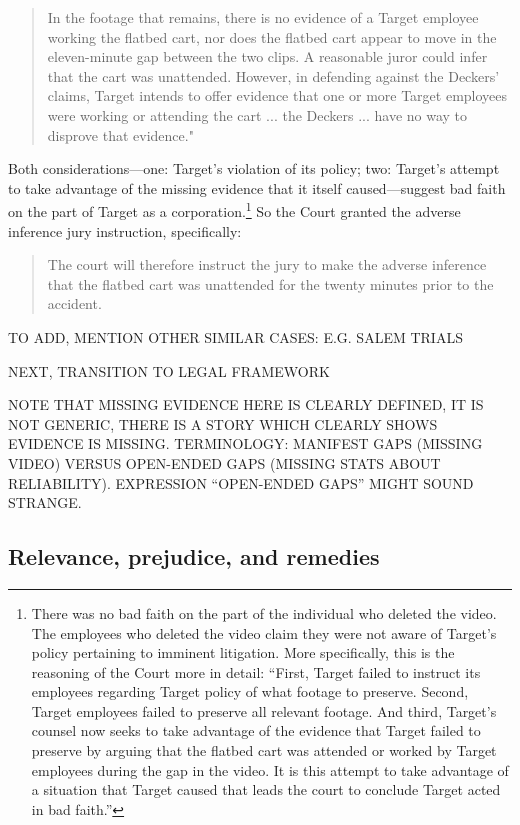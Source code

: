\documentclass[
  10pt,
  dvipsnames,enabledeprecatedfontcommands]{scrartcl}
\begin{document}
\begin{quote}
In the footage that remains, there is no evidence of a Target employee working the flatbed cart, nor does the flatbed cart appear to move in the eleven-minute gap between the two clips. A reasonable juror could infer that the cart was unattended. However, in defending against the Deckers’ claims, Target intends to offer evidence that one or more Target employees were working or attending the cart ... the Deckers ... have no way to disprove that evidence."
\end{quote}

\noindent Both considerations---one: Target's violation of its policy;
two: Target's attempt to take advantage of the missing evidence that it
itself caused---suggest bad faith on the part of Target as a
corporation.\footnote{There was no bad faith on the part of the
  individual who deleted the video. The employees who deleted the video
  claim they were not aware of Target's policy pertaining to imminent
  litigation. More specifically, this is the reasoning of the Court more
  in detail: ``First, Target failed to instruct its employees regarding
  Target policy of what footage to preserve. Second, Target employees
  failed to preserve all relevant footage. And third, Target's counsel
  now seeks to take advantage of the evidence that Target failed to
  preserve by arguing that the flatbed cart was attended or worked by
  Target employees during the gap in the video. It is this attempt to
  take advantage of a situation that Target caused that leads the court
  to conclude Target acted in bad faith.''} So the Court granted the
adverse inference jury instruction, specifically:

\begin{quote}
The court will therefore instruct the jury to make the adverse inference that the flatbed cart was unattended for the twenty minutes prior to the accident.
\end{quote}

TO ADD, MENTION OTHER SIMILAR CASES: E.G. SALEM TRIALS

NEXT, TRANSITION TO LEGAL FRAMEWORK

NOTE THAT MISSING EVIDENCE HERE IS CLEARLY DEFINED, IT IS NOT GENERIC,
THERE IS A STORY WHICH CLEARLY SHOWS EVIDENCE IS MISSING. TERMINOLOGY:
MANIFEST GAPS (MISSING VIDEO) VERSUS OPEN-ENDED GAPS (MISSING STATS
ABOUT RELIABILITY). EXPRESSION ``OPEN-ENDED GAPS'' MIGHT SOUND STRANGE.

\hypertarget{relevance-prejudice-and-remedies}{%
\subsection{Relevance, prejudice, and
remedies}\label{relevance-prejudice-and-remedies}}
\end{document}
